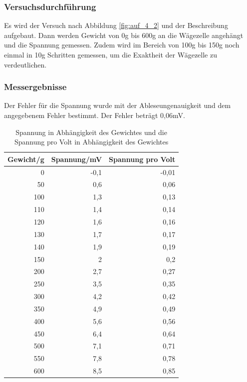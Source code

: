 \documentclass[12pt,a4paper]{article}
\begin{document}
\subsubsection*{Versuchsdurchführung}

Es wird der Versuch nach Abbildung \ref{fig:auf_4_2} und der Beschreibung aufgebaut. Dann werden Gewicht von 0g bis 600g an die Wägezelle angehängt und die Spannung gemessen. Zudem wird im Bereich von 100g bis 150g noch einmal in 10g Schritten gemessen, um die Exaktheit der Wägezelle zu verdeutlichen.

\subsubsection*{Messergebnisse}

Der Fehler für die Spannung wurde mit der Ableseungenauigkeit und dem angegebenem Fehler bestimmt. Der Fehler beträgt 0,06mV. 

\begin{table}[H]
\begin{center}
\begin{tabular}{|r|r|r|}
\hline
\multicolumn{1}{|l|}{Gewicht/g} & \multicolumn{1}{l|}{Spannung/mV} & \multicolumn{1}{l|}{Spannung pro Volt} \\ \hline
0 & -0,1 & -0,01 \\ \hline
50 & 0,6 & 0,06 \\ \hline
100 & 1,3 & 0,13 \\ \hline
110 & 1,4 & 0,14 \\ \hline
120 & 1,6 & 0,16 \\ \hline
130 & 1,7 & 0,17 \\ \hline
140 & 1,9 & 0,19 \\ \hline
150 & 2 & 0,2 \\ \hline
200 & 2,7 & 0,27 \\ \hline
250 & 3,5 & 0,35 \\ \hline
300 & 4,2 & 0,42 \\ \hline
350 & 4,9 & 0,49 \\ \hline
400 & 5,6 & 0,56 \\ \hline
450 & 6,4 & 0,64 \\ \hline
500 & 7,1 & 0,71 \\ \hline
550 & 7,8 & 0,78 \\ \hline
600 & 8,5 & 0,85 \\ \hline
\end{tabular}
\end{center}
\caption{Spannung in Abhängigkeit des Gewichtes und die Spannung pro Volt in Abhängigkeit des Gewichtes}
\label{tab:4_2}
\end{table}
\end{document}
